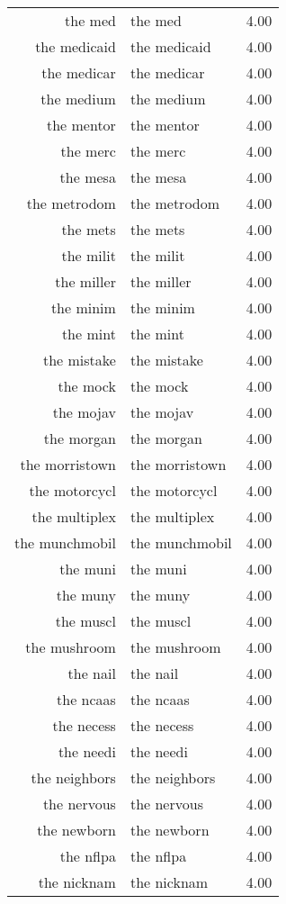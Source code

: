 \begin{table}[ht]
\begin{tabular}{rlr}
  the med & the med & 4.00 \\ 
  the medicaid & the medicaid & 4.00 \\ 
  the medicar & the medicar & 4.00 \\ 
  the medium & the medium & 4.00 \\ 
  the mentor & the mentor & 4.00 \\ 
  the merc & the merc & 4.00 \\ 
  the mesa & the mesa & 4.00 \\ 
  the metrodom & the metrodom & 4.00 \\ 
  the mets & the mets & 4.00 \\ 
  the milit & the milit & 4.00 \\ 
  the miller & the miller & 4.00 \\ 
  the minim & the minim & 4.00 \\ 
  the mint & the mint & 4.00 \\ 
  the mistake & the mistake & 4.00 \\ 
  the mock & the mock & 4.00 \\ 
  the mojav & the mojav & 4.00 \\ 
  the morgan & the morgan & 4.00 \\ 
  the morristown & the morristown & 4.00 \\ 
  the motorcycl & the motorcycl & 4.00 \\ 
  the multiplex & the multiplex & 4.00 \\ 
  the munchmobil & the munchmobil & 4.00 \\ 
  the muni & the muni & 4.00 \\ 
  the muny & the muny & 4.00 \\ 
  the muscl & the muscl & 4.00 \\ 
  the mushroom & the mushroom & 4.00 \\ 
  the nail & the nail & 4.00 \\ 
  the ncaas & the ncaas & 4.00 \\ 
  the necess & the necess & 4.00 \\ 
  the needi & the needi & 4.00 \\ 
  the neighbors & the neighbors & 4.00 \\ 
  the nervous & the nervous & 4.00 \\ 
  the newborn & the newborn & 4.00 \\ 
  the nflpa & the nflpa & 4.00 \\ 
  the nicknam & the nicknam & 4.00 \\ 

\end{tabular}
\end{table}
